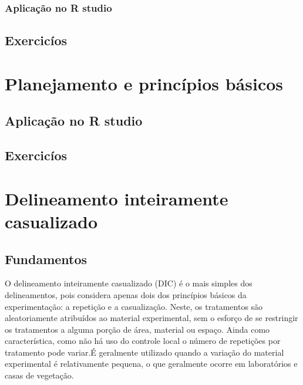 \documentclass[
]{book}
\newenvironment{Shaded}{\begin{snugshade}}{\end{snugshade}}
\newcommand{\AttributeTok}[1]{\textcolor[rgb]{0.77,0.63,0.00}{#1}}
\newcommand{\ConstantTok}[1]{\textcolor[rgb]{0.00,0.00,0.00}{#1}}
\newcommand{\FunctionTok}[1]{\textcolor[rgb]{0.00,0.00,0.00}{#1}}
\newcommand{\NormalTok}[1]{#1}
\newcommand{\SpecialCharTok}[1]{\textcolor[rgb]{0.00,0.00,0.00}{#1}}
\newcommand{\StringTok}[1]{\textcolor[rgb]{0.31,0.60,0.02}{#1}}
\begin{document}
\hypertarget{aplicauxe7uxe3o-no-r-studio}{%
\subsection{Aplicação no R studio}\label{aplicauxe7uxe3o-no-r-studio}}

\hypertarget{exercicuxedos}{%
\section{Exercicíos}\label{exercicuxedos}}

\hypertarget{planejamento}{%
\chapter{Planejamento e princípios básicos}\label{planejamento}}

\hypertarget{aplicauxe7uxe3o-no-r-studio-1}{%
\section{Aplicação no R studio}\label{aplicauxe7uxe3o-no-r-studio-1}}

\hypertarget{exercicuxedos-1}{%
\section{Exercicíos}\label{exercicuxedos-1}}

\begin{Shaded}
\end{Shaded}

\hypertarget{delineamento-inteiramente-casualizado}{%
\chapter{Delineamento inteiramente casualizado}\label{delineamento-inteiramente-casualizado}}

\hypertarget{fundamentos}{%
\section{Fundamentos}\label{fundamentos}}

O delineamento inteiramente casualizado (DIC) é o mais simples dos delineamentos, pois considera apenas dois dos princípios básicos da experimentação: a repetição e a casualização. Neste, os tratamentos são aleatoriamente atribuídos ao material experimental, sem o esforço de se restringir os tratamentos a alguma porção de área, material ou espaço. Ainda como característica, como não há uso do controle local o número de repetições por tratamento pode variar.É geralmente utilizado quando a variação do material experimental é relativamente pequena, o que geralmente ocorre em laboratórios e casas de vegetação.
\end{document}
